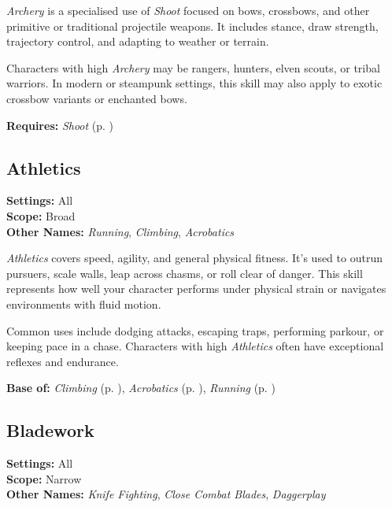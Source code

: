 \emph{Archery} is a specialised use of \emph{Shoot} focused on bows, crossbows, and other primitive or traditional projectile weapons. It includes stance, draw strength, trajectory control, and adapting to weather or terrain.

Characters with high \emph{Archery} may be rangers, hunters, elven scouts, or tribal warriors. In modern or steampunk settings, this skill may also apply to exotic crossbow variants or enchanted bows.

\vspace{0.5\baselineskip}
\noindent\textbf{Requires:} \emph{Shoot} (p. \pageref{skill:shoot})



\subsection{Athletics}\label{skill:athletics}
\textbf{Settings:} All\\
\textbf{Scope:} Broad\\
\textbf{Other Names:} \emph{Running}, \emph{Climbing}, \emph{Acrobatics}\\
\vspace{\baselineskip}

\emph{Athletics} covers speed, agility, and general physical fitness. It's used to outrun pursuers, scale walls, leap across chasms, or roll clear of danger. This skill represents how well your character performs under physical strain or navigates environments with fluid motion.

Common uses include dodging attacks, escaping traps, performing parkour, or keeping pace in a chase. Characters with high \emph{Athletics} often have exceptional reflexes and endurance.

\vspace{0.5\baselineskip}
\noindent\textbf{Base of:} \emph{Climbing} (p. \pageref{skill:climbing}), \emph{Acrobatics} (p. \pageref{skill:acrobatics}), \emph{Running} (p. \pageref{skill:running})



\subsection{Bladework}\label{skill:bladework}
\textbf{Settings:} All\\
\textbf{Scope:} Narrow\\
\textbf{Other Names:} \emph{Knife Fighting}, \emph{Close Combat Blades}, \emph{Daggerplay}\\
\vspace{\baselineskip}

